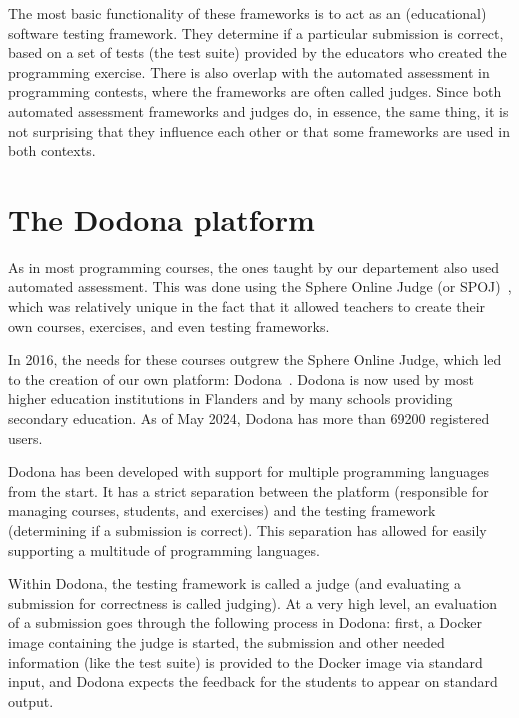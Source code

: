 \documentclass[./main]{subfiles}
\begin{document}
The most basic functionality of these frameworks is to act as an (educational) software testing framework.
They determine if a particular submission is correct, based on a set of tests (the test suite) provided by the educators who created the programming exercise.
There is also overlap with the automated assessment in programming contests, where the frameworks are often called judges.
Since both automated assessment frameworks and judges do, in essence, the same thing, it is not surprising that they influence each other or that some frameworks are used in both contexts.

\section{The Dodona platform}\label{sec:dodona}

As in most programming courses, the ones taught by our departement also used automated assessment.
This was done using the Sphere Online Judge (or SPOJ)~\autocite{kosowskiApplicationOnlineJudge2007}, which was relatively unique in the fact that it allowed teachers to create their own courses, exercises, and even testing frameworks.

In 2016, the needs for these courses outgrew the Sphere Online Judge, which led to the creation of our own platform: Dodona~\autocite{vanpetegemDodonaLearnCode2023}.
Dodona is now used by most higher education institutions in Flanders and by many schools providing secondary education.
As of May 2024, Dodona has more than \num{69200} registered users.

Dodona has been developed with support for multiple programming languages from the start.
It has a strict separation between the platform (responsible for managing courses, students, and exercises) and the testing framework (determining if a submission is correct).
This separation has allowed for easily supporting a multitude of programming languages.

Within Dodona, the testing framework is called a judge (and evaluating a submission for correctness is called judging).
At a very high level, an evaluation of a submission goes through the following process in Dodona: first, a Docker image containing the judge is started, the submission and other needed information (like the test suite) is provided to the Docker image via standard input, and Dodona expects the feedback for the students to appear on standard output.
\end{document}
